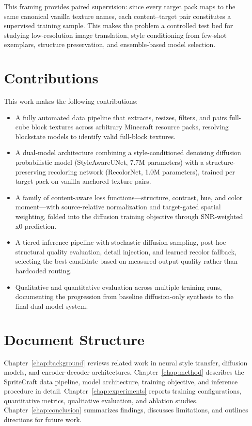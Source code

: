 This framing provides paired supervision: since every target pack maps to the same canonical vanilla texture names, each content--target pair constitutes a supervised training sample. This makes the problem a controlled test bed for studying low-resolution image translation, style conditioning from few-shot exemplars, structure preservation, and ensemble-based model selection.

\section{Contributions}

This work makes the following contributions:
\begin{itemize}
    \item A fully automated data pipeline that extracts, resizes, filters, and pairs full-cube block textures across arbitrary Minecraft resource packs, resolving blockstate models to identify valid full-block textures.
    \item A dual-model architecture combining a style-conditioned denoising diffusion probabilistic model (StyleAwareUNet, 7.7M parameters) with a structure-preserving recoloring network (RecolorNet, 1.0M parameters), trained per target pack on vanilla-anchored texture pairs.
    \item A family of content-aware loss functions---structure, contrast, hue, and color moment---with source-relative normalization and target-gated spatial weighting, folded into the diffusion training objective through SNR-weighted x0 prediction.
    \item A tiered inference pipeline with stochastic diffusion sampling, post-hoc structural quality evaluation, detail injection, and learned recolor fallback, selecting the best candidate based on measured output quality rather than hardcoded routing.
    \item Qualitative and quantitative evaluation across multiple training runs, documenting the progression from baseline diffusion-only synthesis to the final dual-model system.
\end{itemize}

\section{Document Structure}

Chapter~\ref{chap:background} reviews related work in neural style transfer, diffusion models, and encoder-decoder architectures. Chapter~\ref{chap:method} describes the SpriteCraft data pipeline, model architecture, training objective, and inference procedure in detail. Chapter~\ref{chap:experiments} reports training configurations, quantitative metrics, qualitative evaluation, and ablation studies. Chapter~\ref{chap:conclusion} summarizes findings, discusses limitations, and outlines directions for future work.
